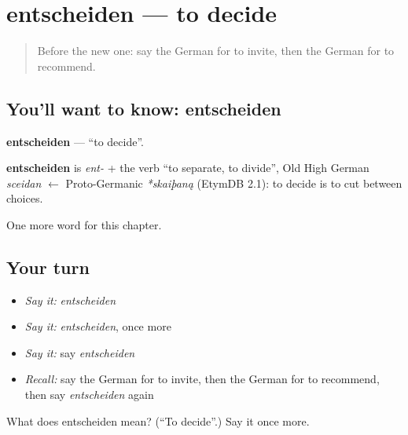 \section[entscheiden]{entscheiden — to decide}

\label{lesson:GE-C145-entscheiden}



\begin{quote}
Before the new one: say the German for to invite, then the German for to recommend.
\end{quote}

\subsection*{You'll want to know: entscheiden}
\textbf{entscheiden} — \textquotedblleft{}to decide\textquotedblright{}.

\begin{cousinweb}
\textbf{entscheiden} is \emph{ent-} + the verb \textquotedblleft{}to separate, to divide\textquotedblright{}, Old High German \emph{sceidan} $\leftarrow$ Proto-Germanic \emph{*skaiþaną} (EtymDB 2.1): to decide is to cut between choices.
\end{cousinweb}

\begin{grammarlens}[title={What you've built}]
One more word for this chapter.
\end{grammarlens}

\subsection*{Your turn}
\begin{itemize}
\raggedright
  \item \emph{Say it:} \emph{entscheiden}
  \item \emph{Say it:} \emph{entscheiden}, once more
  \item \emph{Say it:} say \emph{entscheiden}
  \item \emph{Recall:} say the German for to invite, then the German for to recommend, then say \emph{entscheiden} again
\end{itemize}

\begin{tcolorbox}[breakable,colback=teal!4,colframe=teal!35!black,title={Before you move on}]
What does entscheiden mean? (\textquotedblleft{}To decide\textquotedblright{}.) Say it once more.
\end{tcolorbox}
